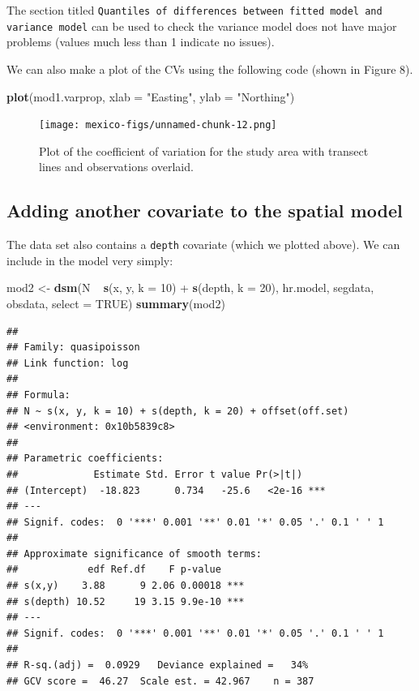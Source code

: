 \documentclass[]{amsart}
\newenvironment{Shaded}{}{}
\newcommand{\KeywordTok}[1]{\textcolor[rgb]{0.00,0.44,0.13}{\textbf{{#1}}}}
\newcommand{\DataTypeTok}[1]{\textcolor[rgb]{0.56,0.13,0.00}{{#1}}}
\newcommand{\DecValTok}[1]{\textcolor[rgb]{0.25,0.63,0.44}{{#1}}}
\newcommand{\StringTok}[1]{\textcolor[rgb]{0.25,0.44,0.63}{{#1}}}
\newcommand{\OtherTok}[1]{\textcolor[rgb]{0.00,0.44,0.13}{{#1}}}
\newcommand{\NormalTok}[1]{{#1}}
\begin{document}
The section titled
\texttt{Quantiles of differences between fitted model and variance model}
can be used to check the variance model does not have major problems
(values much less than 1 indicate no issues).

We can also make a plot of the CVs using the following code (shown in
Figure 8).

\begin{Shaded}
\begin{Highlighting}[]
\KeywordTok{plot}\NormalTok{(mod1.varprop, }\DataTypeTok{xlab =} \StringTok{"Easting"}\NormalTok{, }\DataTypeTok{ylab =} \StringTok{"Northing"}\NormalTok{)}
\end{Highlighting}
\end{Shaded}

\begin{figure}[htbp]
\centering
\texttt{[image: mexico-figs/unnamed-chunk-12.png]}
\caption{Plot of the coefficient of variation for the study area with
transect lines and observations overlaid.}
\end{figure}

\subsection{Adding another covariate to the spatial model}

The data set also contains a \texttt{depth} covariate (which we plotted
above). We can include in the model very simply:

\begin{Shaded}
\begin{Highlighting}[]
\NormalTok{mod2 <-}\StringTok{ }\KeywordTok{dsm}\NormalTok{(N ~}\StringTok{ }\KeywordTok{s}\NormalTok{(x, y, }\DataTypeTok{k =} \DecValTok{10}\NormalTok{) +}\StringTok{ }\KeywordTok{s}\NormalTok{(depth, }\DataTypeTok{k =} \DecValTok{20}\NormalTok{), hr.model, segdata, obsdata, }
    \DataTypeTok{select =} \OtherTok{TRUE}\NormalTok{)}
\KeywordTok{summary}\NormalTok{(mod2)}
\end{Highlighting}
\end{Shaded}

\begin{verbatim}
## 
## Family: quasipoisson 
## Link function: log 
## 
## Formula:
## N ~ s(x, y, k = 10) + s(depth, k = 20) + offset(off.set)
## <environment: 0x10b5839c8>
## 
## Parametric coefficients:
##             Estimate Std. Error t value Pr(>|t|)    
## (Intercept)  -18.823      0.734   -25.6   <2e-16 ***
## ---
## Signif. codes:  0 '***' 0.001 '**' 0.01 '*' 0.05 '.' 0.1 ' ' 1
## 
## Approximate significance of smooth terms:
##            edf Ref.df    F p-value    
## s(x,y)    3.88      9 2.06 0.00018 ***
## s(depth) 10.52     19 3.15 9.9e-10 ***
## ---
## Signif. codes:  0 '***' 0.001 '**' 0.01 '*' 0.05 '.' 0.1 ' ' 1
## 
## R-sq.(adj) =  0.0929   Deviance explained =   34%
## GCV score =  46.27  Scale est. = 42.967    n = 387
\end{verbatim}
\end{document}
